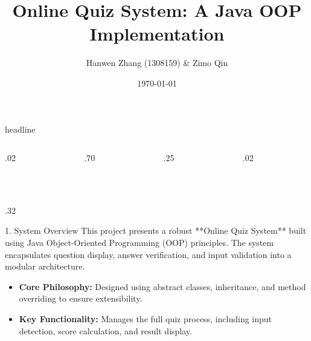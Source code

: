 \documentclass[final]{beamer}
\title{\huge Online Quiz System: A Java OOP Implementation}
\author{\large Hanwen Zhang (1308159) \& Zimo Qin}
\institute{\large Wenzhou-Kean University | CPS 2231 W02}
\date{\today}
\begin{document}
\begin{frame}[t]

\begin{beamercolorbox}[wd=\paperwidth]{headline}
  \begin{columns}[T]
    \begin{column}{.02\paperwidth}\end{column}
    \begin{column}{.70\paperwidth}
      \vskip2cm
      \centering
      \\[1ex]
      \\[1ex]
      \\[1cm]
    \end{column}
    \begin{column}{.25\paperwidth}
      \vskip1.5cm
      \vskip1cm
    \end{column}
    \begin{column}{.02\paperwidth}\end{column}
  \end{columns}
\end{beamercolorbox}

\begin{columns}[T]

  \begin{column}{.32\paperwidth}
    
    \begin{block}{1. System Overview}
      This project presents a robust **Online Quiz System** built using Java Object-Oriented Programming (OOP) principles. The system encapsulates question display, answer verification, and input validation into a modular architecture.
      
      \begin{itemize}
          \item \textbf{Core Philosophy:} Designed using abstract classes, inheritance, and method overriding to ensure extensibility.
          \item \textbf{Key Functionality:} Manages the full quiz process, including input detection, score calculation, and result display.
      \end{itemize}
    \end{block}


\end{column}
\end{columns}
\end{frame}
\end{document}
